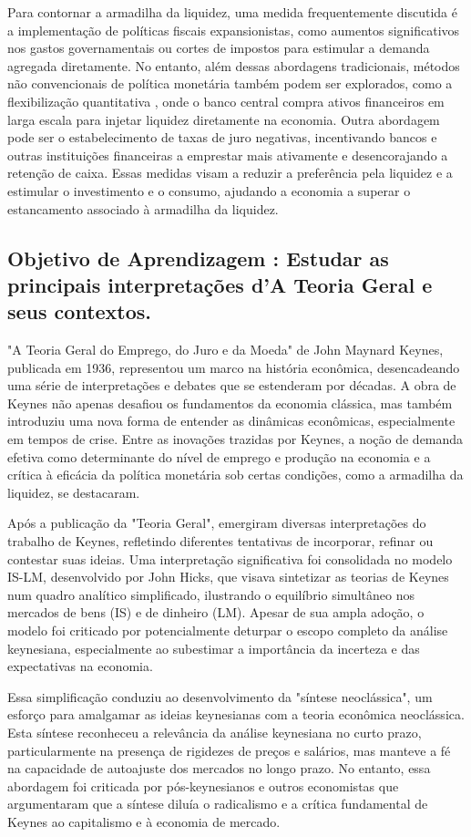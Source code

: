 \documentclass[a4paper,12pt]{article}[abntex2]
\begin{document}
Para contornar a armadilha da liquidez, uma medida frequentemente discutida é a implementação de políticas fiscais expansionistas, como aumentos significativos nos gastos governamentais ou cortes de impostos para estimular a demanda agregada diretamente. No entanto, além dessas abordagens tradicionais, métodos não convencionais de política monetária também podem ser explorados, como a flexibilização quantitativa , onde o banco central compra ativos financeiros em larga escala para injetar liquidez diretamente na economia. Outra abordagem pode ser o estabelecimento de taxas de juro negativas, incentivando bancos e outras instituições financeiras a emprestar mais ativamente e desencorajando a retenção de caixa. Essas medidas visam a reduzir a preferência pela liquidez e a estimular o investimento e o consumo, ajudando a economia a superar o estancamento associado à armadilha da liquidez.

\subsection{\textbf{Objetivo de Aprendizagem : Estudar as principais interpretações d’A Teoria Geral e seus contextos.}}
"A Teoria Geral do Emprego, do Juro e da Moeda" de John Maynard Keynes, publicada em 1936, representou um marco na história econômica, desencadeando uma série de interpretações e debates que se estenderam por décadas. A obra de Keynes não apenas desafiou os fundamentos da economia clássica, mas também introduziu uma nova forma de entender as dinâmicas econômicas, especialmente em tempos de crise. Entre as inovações trazidas por Keynes, a noção de demanda efetiva como determinante do nível de emprego e produção na economia e a crítica à eficácia da política monetária sob certas condições, como a armadilha da liquidez, se destacaram.

Após a publicação da "Teoria Geral", emergiram diversas interpretações do trabalho de Keynes, refletindo diferentes tentativas de incorporar, refinar ou contestar suas ideias. Uma interpretação significativa foi consolidada no modelo IS-LM, desenvolvido por John Hicks, que visava sintetizar as teorias de Keynes num quadro analítico simplificado, ilustrando o equilíbrio simultâneo nos mercados de bens (IS) e de dinheiro (LM). Apesar de sua ampla adoção, o modelo foi criticado por potencialmente deturpar o escopo completo da análise keynesiana, especialmente ao subestimar a importância da incerteza e das expectativas na economia.

Essa simplificação conduziu ao desenvolvimento da "síntese neoclássica", um esforço para amalgamar as ideias keynesianas com a teoria econômica neoclássica. Esta síntese reconheceu a relevância da análise keynesiana no curto prazo, particularmente na presença de rigidezes de preços e salários, mas manteve a fé na capacidade de autoajuste dos mercados no longo prazo. No entanto, essa abordagem foi criticada por pós-keynesianos e outros economistas que argumentaram que a síntese diluía o radicalismo e a crítica fundamental de Keynes ao capitalismo e à economia de mercado.
\end{document}
